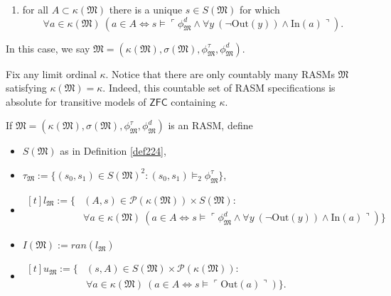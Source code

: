 \documentclass[12pt]{article}
\numberwithin{equation}{section}
\begin{document}
\begin{defi}
\begin{enumerate}[label=(D\arabic*)]
    \item for all $A \subset \kappa(\mathfrak{M})$ there is a unique $s \in S(\mathfrak{M})$ for which
    \begin{equation*}
        \forall a \in \kappa(\mathfrak{M}) \ (a \in A \iff s \models \ulcorner \phi^d_{\mathfrak{M}} \wedge \forall y \ (\neg \mathrm{Out}(y)) \wedge \mathrm{In}(a) \urcorner) \text{.}
    \end{equation*}
\end{enumerate}
In this case, we say $\mathfrak{M} = (\kappa(\mathfrak{M}), \sigma(\mathfrak{M}), \phi^{\tau}_{\mathfrak{M}}, \phi^d_{\mathfrak{M}})$.
\end{defi}

\begin{rem}\label{rem225}
Fix any limit ordinal $\kappa$. Notice that there are only countably many RASMs $\mathfrak{M}$ satisfying $\kappa(\mathfrak{M}) = \kappa$. Indeed, this countable set of RASM specifications is absolute for transitive models of $\mathsf{ZFC}$ containing $\kappa$.
\end{rem}

\begin{defi}
If $\mathfrak{M} = (\kappa(\mathfrak{M}), \sigma(\mathfrak{M}), \phi^{\tau}_{\mathfrak{M}}, \phi^d_{\mathfrak{M}})$ is an RASM, define 
\begin{itemize}
    \item $S(\mathfrak{M})$ as in Definition \ref{def224},
    \item $\tau_{\mathfrak{M}} := \{(s_0, s_1) \in S(\mathfrak{M})^2 : (s_0, s_1) \models_2 \phi^{\tau}_{\mathfrak{M}}\}$,
    \item 
    \!
    $\begin{aligned}[t]
       l_{\mathfrak{M}} := \{ & (A, s) \in \mathcal{P}(\kappa(\mathfrak{M})) \times S(\mathfrak{M}) : \\
       & \forall a \in \kappa(\mathfrak{M}) \ (a \in A \iff s \models \ulcorner \phi^d_{\mathfrak{M}} \wedge \forall y \ (\neg \mathrm{Out}(y)) \wedge \mathrm{In}(a) \urcorner)\} 
    \end{aligned}$
    \item $I(\mathfrak{M}) := ran(l_{\mathfrak{M}})$
    \item 
    \!
    $\begin{aligned}[t]
        u_{\mathfrak{M}} := \{ & (s, A) \in S(\mathfrak{M}) \times \mathcal{P}(\kappa(\mathfrak{M})) : \\
        & \forall a \in \kappa(\mathfrak{M}) \ (a \in A \iff s \models \ulcorner \mathrm{Out}(a) \urcorner)\} \text{.}
    \end{aligned}$
\end{itemize}
\end{defi}
\end{document}
